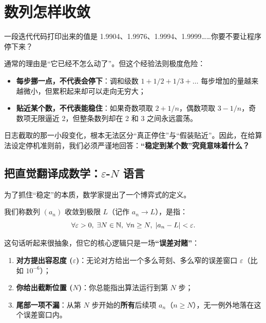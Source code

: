 \section{数列怎样收敛}
\label{sec:02-Calculus/05-Sequences-and-Series/01}

一段迭代代码打印出来的值是 1.9904、1.9976、1.9994、1.9999……你要不要让程序停下来？

通常的理由是``它已经不怎么动了''。但这个经验法则极度危险：
\begin{itemize}
    \item \textbf{每步挪一点，不代表会停下}：调和级数 \(1 + 1/2 + 1/3 + \dots\) 每步增加的量越来越微小，但累积起来却可以走向无穷大；
    \item \textbf{贴近某个数，不代表能稳住}：如果奇数项取 \(2 + 1/n\)，偶数项取 \(3 - 1/n\)，奇数项无限逼近 2，但整条数列却在 2 和 3 之间永远震荡。
\end{itemize}

日志截取的那一小段变化，根本无法区分``真正停住''与``假装贴近''。因此，在给算法设定停机准则前，我们必须严谨地回答：\textbf{``稳定到某个数''究竟意味着什么？}

\subsection{把直觉翻译成数学：\(\varepsilon\)-\(N\) 语言}

为了抓住``稳定''的本质，数学家提出了一个博弈式的定义。

我们称数列 \((a_n)\) 收敛到极限 \(L\)（记作 \(a_n \to L\)），是指：
\[
\forall\varepsilon>0,\;\exists N\in\mathbb{N},\;\forall n\ge N,\;\left|a_n-L\right|<\varepsilon.
\]

这句话听起来很抽象，但它的核心逻辑只是一场\textbf{``误差对赌''}：
\begin{enumerate}
    \item \textbf{对方提出容忍度 (\(\varepsilon\))}：无论对方给出一个多么苛刻、多么窄的误差窗口 \(\varepsilon\)（比如 \(10^{-6}\)）；
    \item \textbf{你给出截断位置 (\(N\))}：你总能指出算法运行到第 \(N\) 步；
    \item \textbf{尾部一项不漏}：从第 \(N\) 步开始的\textbf{所有}后续项 \(a_n\)（\(n \ge N\)），无一例外地落在这个误差窗口内。
\end{enumerate}

